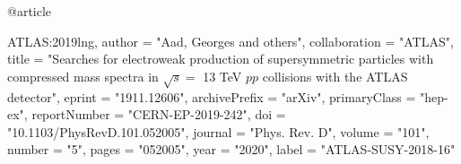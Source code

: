 @article{ATLAS:2019lng,
    author = "Aad, Georges and others",
    collaboration = "ATLAS",
    title = "{Searches for electroweak production of supersymmetric particles with compressed mass spectra in $\sqrt{s}=$ 13 TeV $pp$ collisions with the ATLAS detector}",
    eprint = "1911.12606",
    archivePrefix = "arXiv",
    primaryClass = "hep-ex",
    reportNumber = "CERN-EP-2019-242",
    doi = "10.1103/PhysRevD.101.052005",
    journal = "Phys. Rev. D",
    volume = "101",
    number = "5",
    pages = "052005",
    year = "2020",
    label = "ATLAS-SUSY-2018-16"

}

